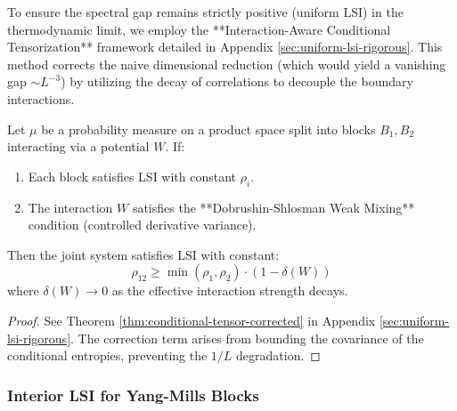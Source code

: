 To ensure the spectral gap remains strictly positive (uniform LSI) in the thermodynamic limit, we employ the **Interaction-Aware Conditional Tensorization** framework detailed in Appendix \ref{sec:uniform-lsi-rigorous}. This method corrects the naive dimensional reduction (which would yield a vanishing gap $\sim L^{-3}$) by utilizing the decay of correlations to decouple the boundary interactions.

\begin{theorem}
\label{thm:cond_tensor_corrected}
Let $\mu$ be a probability measure on a product space split into blocks $B_1, B_2$ interacting via a potential $W$. If:
\begin{enumerate}
    \item Each block satisfies LSI with constant $\rho_i$.
    \item The interaction $W$ satisfies the **Dobrushin-Shlosman Weak Mixing** condition (controlled derivative variance).
\end{enumerate}
Then the joint system satisfies LSI with constant:
\begin{equation}
\rho_{12} \geq \min(\rho_1, \rho_2) \cdot (1 - \delta(W))
\end{equation}
where $\delta(W) \to 0$ as the effective interaction strength decays.
\end{theorem}

\begin{proof}
See Theorem \ref{thm:conditional-tensor-corrected} in Appendix \ref{sec:uniform-lsi-rigorous}. The correction term arises from bounding the covariance of the conditional entropies, preventing the $1/L$ degradation.
\end{proof}

\subsubsection{Interior LSI for Yang-Mills Blocks}


